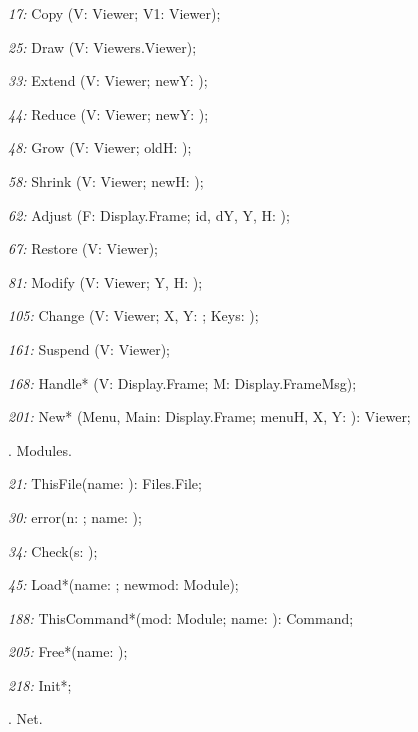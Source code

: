 \item{\it 17:} Copy (V: Viewer; \VAR V1: Viewer);
\item{\it 25:} Draw (V: Viewers.Viewer);
\item{\it 33:} Extend (V: Viewer; newY: \INTEGER);
\item{\it 44:} Reduce (V: Viewer; newY: \INTEGER);
\item{\it 48:} Grow (V: Viewer; oldH: \INTEGER);
\item{\it 58:} Shrink (V: Viewer; newH: \INTEGER);
\item{\it 62:} Adjust (F: Display.Frame; id, dY, Y, H: \INTEGER);
\item{\it 67:} Restore (V: Viewer);
\item{\it 81:} Modify (V: Viewer; Y, H: \INTEGER);
\item{\it 105:} Change (V: Viewer; X, Y: \INTEGER; Keys: \SET);
\item{\it 161:} Suspend (V: Viewer);
\item{\it 168:} Handle* (V: Display.Frame; \VAR M: Display.FrameMsg);
\item{\it 201:} New* (Menu, Main: Display.Frame; menuH, X, Y: \INTEGER): Viewer; 

. Modules.

\item{\it 21:} ThisFile(name: \ARRAYOF\CHAR): Files.File;
\item{\it 30:} error(n: \INTEGER; name: \ARRAYOF\CHAR);
\item{\it 34:} Check(s: \ARRAYOF\CHAR);
\item{\it 45:} Load*(name: \ARRAYOF\CHAR; \VAR newmod: Module);
\item{\it 188:} ThisCommand*(mod: Module; name: \ARRAYOF\CHAR): Command;
\item{\it 205:} Free*(name: \ARRAYOF\CHAR);
\item{\it 218:} Init*;

. Net.

